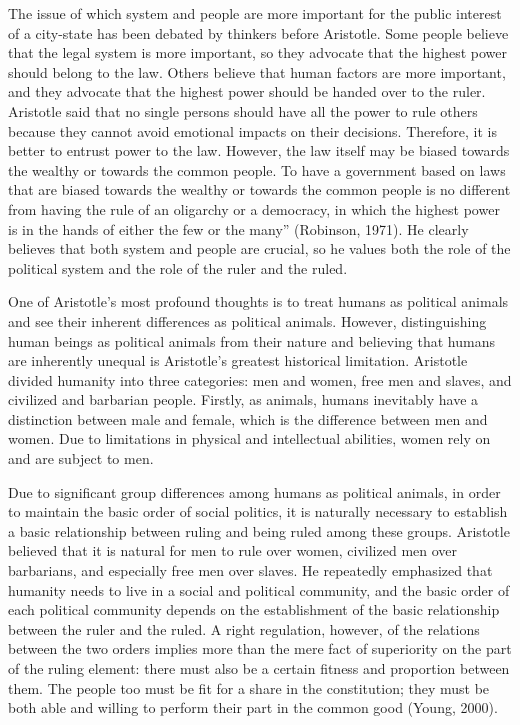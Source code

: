 \documentclass[11pt]{article}
\begin{document}
The issue of which system and people are more important for the public interest of a city-state has been debated by thinkers before Aristotle. Some people believe that the legal system is more important, so they advocate that the highest power should belong to the law. Others believe that human factors are more important, and they advocate that the highest power should be handed over to the ruler. Aristotle said that no single persons should have all the power to rule others because they cannot avoid emotional impacts on their decisions. Therefore, it is better to entrust power to the law. However, the law itself may be biased towards the wealthy or towards the common people. To have a government based on laws that are biased towards the wealthy or towards the common people is no different from having the rule of an oligarchy or a democracy, in which the highest power is in the hands of either the few or the many” (Robinson, 1971). He clearly believes that both system and people are crucial, so he values both the role of the political system and the role of the ruler and the ruled.

One of Aristotle's most profound thoughts is to treat humans as political animals and see their inherent differences as political animals. However, distinguishing human beings as political animals from their nature and believing that humans are inherently unequal is Aristotle's greatest historical limitation. Aristotle divided humanity into three categories: men and women, free men and slaves, and civilized and barbarian people. Firstly, as animals, humans inevitably have a distinction between male and female, which is the difference between men and women. Due to limitations in physical and intellectual abilities, women rely on and are subject to men.

Due to significant group differences among humans as political animals, in order to maintain the basic order of social politics, it is naturally necessary to establish a basic relationship between ruling and being ruled among these groups. Aristotle believed that it is natural for men to rule over women, civilized men over barbarians, and especially free men over slaves. He repeatedly emphasized that humanity needs to live in a social and political community, and the basic order of each political community depends on the establishment of the basic relationship between the ruler and the ruled. A right regulation, however, of the relations between the two orders implies more than the mere fact of superiority on the part of the ruling element: there must also be a certain fitness and proportion between them. The people too must be fit for a share in the constitution; they must be both able and willing to perform their part in the common good (Young, 2000).
\end{document}
